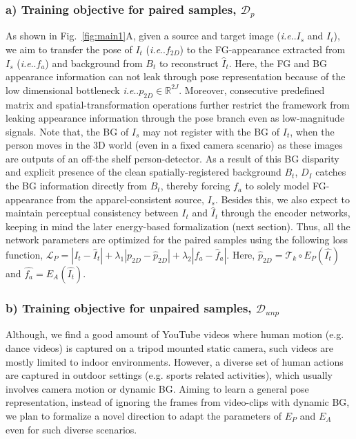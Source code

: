 \documentclass[letterpaper]{article} \usepackage{aaai20}  \usepackage{times}  \usepackage{helvet}  \usepackage{courier}  \usepackage{url}  \usepackage{graphicx}  \usepackage{amsmath}
\makeatletter
\DeclareRobustCommand\onedot{\futurelet\@let@token\@onedot}
\def\@onedot{\ifx\@let@token.\else.\null\fi\xspace}
\def\ie{\emph{i.e}\onedot} \def\Ie{\emph{I.e}\onedot}
\makeatother
\begin{document}
\subsubsection{a) Training objective for paired samples, $\mathcal{D}_p$} As shown in Fig.~\ref{fig:main1}A, given a source and target image (\ie $I_s$ and $I_t$), we aim to transfer the pose of $I_t$ (\ie $f_{2D}$) to the FG-appearance extracted from $I_s$ (\ie $f_a$) and background from $B_t$ to reconstruct $\hat{I}_t$.  Here, the FG and BG appearance information can not leak through pose representation because of the low dimensional bottleneck \ie $p_{2D}\in\mathbb{R}^{2J}$. Moreover, consecutive predefined matrix  and  spatial-transformation  operations  further restrict the framework from leaking appearance information through the pose branch even as low-magnitude signals. Note that, the BG of $I_s$ may not register with the BG of $I_t$, when the person moves in the 3D world (even in a fixed camera scenario) as these images are outputs of an off-the shelf person-detector. As a result of this BG disparity and explicit presence of the clean spatially-registered background $B_t$, $D_I$ catches the BG information directly from $B_t$, thereby forcing $f_a$ to solely model FG-appearance from the apparel-consistent source, $I_s$. Besides this, we also expect to maintain perceptual consistency between $I_t$ and $\hat{I}_t$ through the encoder networks, keeping in mind the later energy-based formalization (next section). Thus, all the network parameters are optimized for the paired samples using the following loss function, $\mathcal{L}_P = |I_t - \hat{I}_t| + \lambda_1|p_{2D}-\hat{p}_{2D}|+\lambda_2|f_a - \hat{f}_a|$. Here, $\hat{p}_{2D} = \mathcal{T}_{k}\circ E_P(\hat{I_t})$ and $\hat{f_a} = E_A(\hat{I_t})$.

\subsubsection{b) Training objective for unpaired samples, $\mathcal{D}_{unp}$} Although, we find a good amount of YouTube videos where human motion (e.g. dance videos) is captured on a tripod mounted static camera, such videos are mostly limited to indoor environments. However, a diverse set of human actions are captured in outdoor settings (e.g. sports related activities), which usually involves camera motion or dynamic BG. Aiming to learn a general pose representation, instead of ignoring the frames from video-clips with dynamic BG, we plan to formalize a novel direction to adapt the parameters of $E_P$ and $E_A$ even for such diverse scenarios.
\end{document}
